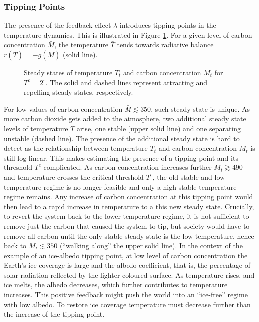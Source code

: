 \documentclass[../../main.tex]{subfiles}
\begin{document}
\subsubsection{Tipping Points}

The presence of the feedback effect $\lambda$ introduces tipping points in the temperature dynamics. This is illustrated in Figure \ref{fig:bare-nullclines}. For a given level of carbon concentration $\bar{M}$, the temperature $\bar{T}$ tends towards radiative balance $r(\bar{T}) = - g(\bar{M})$ (solid line). \begin{figure}[htbp]
    \centering
    
    \caption{Steady states of temperature $T_t$ and carbon concentration $M_t$ for $T^c = 2^\circ$. The solid and dashed lines represent attracting and repelling steady states, respectively.}
    \label{fig:bare-nullclines}
\end{figure} \noindent For low values of carbon concentration $\bar{M} \lesssim 350$, such steady state is unique. As more carbon dioxide gets added to the atmosphere, two additional steady state levels of temperature $\bar{T}$ arise, one stable (upper solid line) and one separating unstable (dashed line). The presence of the additional steady state is hard to detect as the relationship between temperature $T_t$ and carbon concentration $M_t$ is still log-linear. This makes estimating the presence of a tipping point and its threshold $T^c$ complicated. As carbon concentration increases further $M_t \gtrsim 490$ and temperature crosses the critical threshold $T^c$, the old stable and low temperature regime is no longer feasible and only a high stable temperature regime remains. Any increase of carbon concentration at this tipping point would then lead to a rapid increase in temperature to a this new steady state. Crucially, to revert the system back to the lower temperature regime, it is not sufficient to remove just the carbon that caused the system to tip, but society would have to remove all carbon until the only stable steady state is the low temperature, hence back to $M_t \lesssim 350$ (``walking along'' the upper solid line). In the context of the example of an ice-albedo tipping point, at low level of carbon concentration the Earth's ice coverage is large and the albedo coefficient, that is, the percentage of solar radiation reflected by the lighter coloured surface. As temperature rises, and ice melts, the albedo decreases, which further contributes to temperature increases. This positive feedback might push the world into an ``ice-free'' regime with low albedo. To restore ice coverage temperature must decrease further than the increase of the tipping point.
\end{document}
